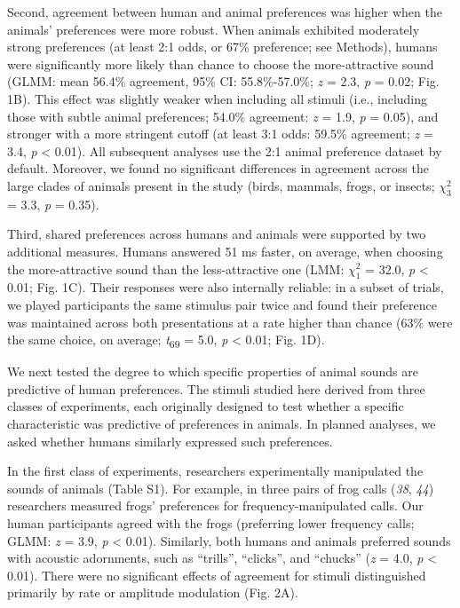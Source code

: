 \documentclass[
]{article}
\begin{document}
\clearpage

Second, agreement between human and animal preferences was higher when
the animals' preferences were more robust. When animals exhibited
moderately strong preferences (at least 2:1 odds, or 67\% preference;
see Methods), humans were significantly more likely than chance to
choose the more-attractive sound (GLMM: mean 56.4\% agreement, 95\% CI:
55.8\%-57.0\%; \emph{z} = 2.3, \emph{p} = 0.02; Fig. 1B). This effect
was slightly weaker when including all stimuli (i.e., including those
with subtle animal preferences; 54.0\% agreement: \emph{z} = 1.9,
\emph{p} = 0.05), and stronger with a more stringent cutoff (at least
3:1 odds: 59.5\% agreement; \emph{z} = 3.4, \emph{p} \textless{} 0.01).
All subsequent analyses use the 2:1 animal preference dataset by
default. Moreover, we found no significant differences in agreement
across the large clades of animals present in the study (birds, mammals,
frogs, or insects; \(\chi^{2}_{3}\) = 3.3, \emph{p} = 0.35).

Third, shared preferences across humans and animals were supported by
two additional measures. Humans answered 51 ms faster, on average, when
choosing the more-attractive sound than the less-attractive one (LMM:
\(\chi^{2}_{1}\) = 32.0, \emph{p} \textless{} 0.01; Fig. 1C). Their
responses were also internally reliable: in a subset of trials, we
played participants the same stimulus pair twice and found their
preference was maintained across both presentations at a rate higher
than chance (63\% were the same choice, on average;
\emph{t}\textsubscript{69} = 5.0, \emph{p} \textless{} 0.01; Fig. 1D).

We next tested the degree to which specific properties of animal sounds
are predictive of human preferences. The stimuli studied here derived
from three classes of experiments, each originally designed to test
whether a specific characteristic was predictive of preferences in
animals. In planned analyses, we asked whether humans similarly
expressed such preferences.

In the first class of experiments, researchers experimentally
manipulated the sounds of animals (Table S1). For example, in three
pairs of frog calls (\emph{38}, \emph{44}) researchers measured frogs'
preferences for frequency-manipulated calls. Our human participants
agreed with the frogs (preferring lower frequency calls; GLMM: \emph{z}
= 3.9, \emph{p} \textless{} 0.01). Similarly, both humans and animals
preferred sounds with acoustic adornments, such as ``trills'',
``clicks'', and ``chucks'' (\emph{z} = 4.0, \emph{p} \textless{} 0.01).
There were no significant effects of agreement for stimuli distinguished
primarily by rate or amplitude modulation (Fig. 2A).
\end{document}
